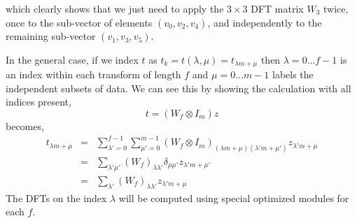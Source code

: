 \documentclass[fleqn,12pt]{article}
\begin{document}
%
which clearly shows that we just need to apply the $3\times 3$ DFT
matrix $W_3$ twice, once to the sub-vector of elements $(v_0, v_2, v_4)$,
and independently to the remaining sub-vector $(v_1, v_3, v_5)$.

In the general case, if we index $t$ as $t_k = t(\lambda,\mu) =
t_{\lambda m + \mu}$ then $\lambda = 0 \dots f-1$ is an index within
each transform of length $f$ and $\mu = 0 \dots m-1$ labels the
independent subsets of data. We can see this by showing the
calculation with all indices present,
%
\begin{equation}
t = (W_f \otimes I_m) z 
\end{equation}
%
becomes,
%
\begin{eqnarray}
t_{\lambda m + \mu} &=& \sum_{\lambda'=0}^{f-1} \sum_{\mu'=0}^{m-1} 
        (W_f \otimes I_m)_{(\lambda m + \mu)(\lambda' m + \mu')}
        z_{\lambda'm + \mu} \\
&=& \sum_{\lambda'\mu'} (W_f)_{\lambda\lambda'} \delta_{\mu\mu'} 
        z_{\lambda'm+\mu'} \\
&=& \sum_{\lambda'} (W_f)_{\lambda\lambda'} z_{\lambda'm+\mu}
\end{eqnarray}
%
The DFTs on the index $\lambda$ will be computed using
special optimized modules for each $f$.
\end{document}
